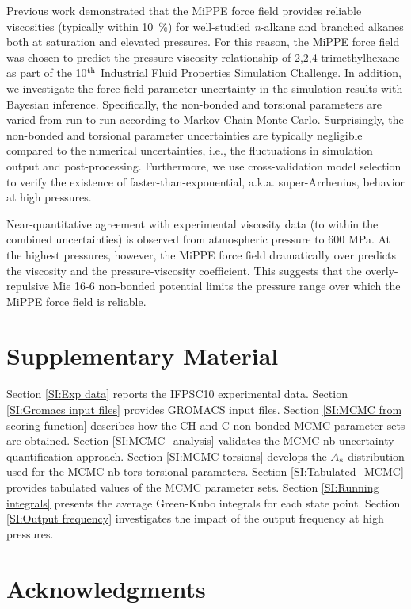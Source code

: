 \documentclass[preprint,review,12pt]{elsarticle}
\begin{document}
    Previous work demonstrated that the MiPPE force field provides reliable viscosities (typically within 10~\%) for well-studied \textit{n}-alkane and branched alkanes both at saturation and elevated pressures. For this reason, the MiPPE force field was chosen to predict the pressure-viscosity relationship of 2,2,4-trimethylhexane as part of the 10$^{\rm th}$ Industrial Fluid Properties Simulation Challenge. In addition, we investigate the force field parameter uncertainty in the simulation results with Bayesian inference. Specifically, the non-bonded and torsional parameters are varied from run to run according to Markov Chain Monte Carlo. Surprisingly, the non-bonded and torsional parameter uncertainties are typically negligible compared to the numerical uncertainties, i.e., the fluctuations in simulation output and post-processing. Furthermore, we use cross-validation model selection to verify the existence of faster-than-exponential, a.k.a. super-Arrhenius, behavior at high pressures. 
    
    Near-quantitative agreement with experimental viscosity data (to within the combined uncertainties) is observed from atmospheric pressure to 600 MPa. At the highest pressures, however, the MiPPE force field dramatically over predicts the viscosity and the pressure-viscosity coefficient. This suggests that the overly-repulsive Mie 16-6 non-bonded potential limits the pressure range over which the MiPPE force field is reliable.
	
	\section*{Supplementary Material}
	
    Section \ref{SI:Exp data} reports the IFPSC10 experimental data. Section \ref{SI:Gromacs input files} provides GROMACS input files. Section \ref{SI:MCMC from scoring function} describes how the CH and C non-bonded MCMC parameter sets are obtained. Section \ref{SI:MCMC_analysis} validates the MCMC-nb uncertainty quantification approach. Section \ref{SI:MCMC torsions} develops the $A_{\rm s}$ distribution used for the MCMC-nb-tors torsional parameters. Section \ref{SI:Tabulated_MCMC} provides tabulated values of the MCMC parameter sets. Section \ref{SI:Running integrals} presents the average Green-Kubo integrals for each state point. Section \ref{SI:Output frequency} investigates the impact of the output frequency at high pressures.
	
	\section*{Acknowledgments}
	
\end{document}
